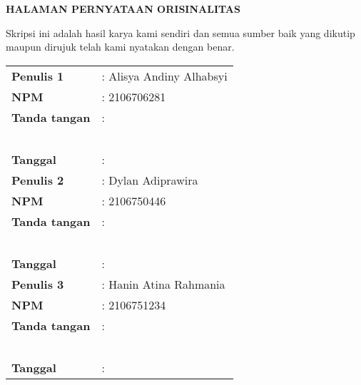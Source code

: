 \documentclass[12pt, a4paper]{article}
\begin{document}
\begin{center}
    {\fontsize{14}{16}\selectfont\textbf{HALAMAN PERNYATAAN ORISINALITAS}}
\end{center}

\vspace*{1cm} %

\begin{center}
	{\fontsize{12}{14}\selectfont 
	Skripsi ini adalah hasil karya kami sendiri dan semua sumber baik yang dikutip \\
	maupun dirujuk telah kami nyatakan dengan benar.}
\end{center}

\vspace*{1cm} %

\begin{center}
	{\fontsize{12}{14}\selectfont %
	\begin{tabular}{|l|l|}
	\hline %
	\textbf{Penulis 1} & : Alisya Andiny Alhabsyi \\ %
	\textbf{NPM} & : 2106706281 \\
	\textbf{Tanda tangan} & : \\
	& \\ %
	& \\
	& \\
	& \\
	& \\
	\textbf{Tanggal} & : \\
	\hline %
	\textbf{Penulis 2} & : Dylan Adiprawira \\
	\textbf{NPM} & : 2106750446 \\
	\textbf{Tanda tangan} & : \\
	& \\ %
	& \\
	& \\
	& \\
	& \\
	\textbf{Tanggal} & : \\
	\hline %
	\textbf{Penulis 3} & : Hanin Atina Rahmania \\
	\textbf{NPM} & : 2106751234 \\
	\textbf{Tanda tangan} & : \\
	& \\ %
	& \\
	& \\
	& \\
	& \\
	\textbf{Tanggal} & : \\
	\hline %
	\end{tabular}
	}
\end{center}
\end{document}

